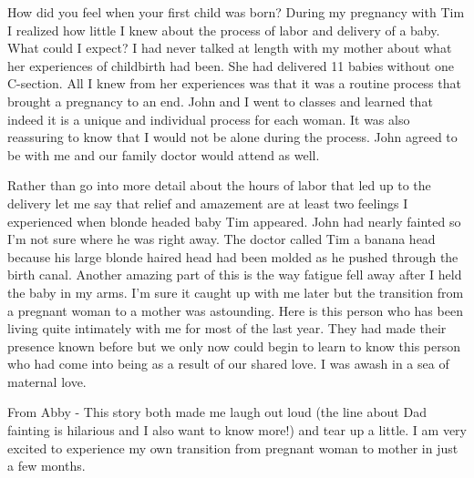 How did you feel when your first child was born?
During my pregnancy with Tim I realized how little I knew about the process of labor and delivery of a baby.
What could I expect? I had never talked at length with my mother about what her experiences of childbirth had been.
She had delivered 11 babies without one C-section.
All I knew from her experiences was that it was a routine process that brought a pregnancy to an end.
John and I went to classes and learned that indeed it is a unique and individual process for each woman.
It was also reassuring to know that I would not be alone during the process.
John agreed to be with me and our family doctor would attend as well.

Rather than go into more detail about the hours of labor that led up to the delivery let me say that relief and amazement are at least two feelings I experienced when blonde headed baby Tim appeared.
John had nearly fainted so I'm not sure where he was right away.
The doctor called Tim a banana head because his large blonde haired head had been molded as he pushed through the birth canal.
Another amazing part of this is the way fatigue fell away after I held the baby in my arms.
I'm sure it caught up with me later but the transition from a pregnant woman to a mother was astounding.
Here is this person who has been living quite intimately with me for most of the last year.
They had made their presence known before but we only now could begin to learn to know this person who had come into being as a result of our shared love.
I was awash in a sea of maternal love.

From Abby - This story both made me laugh out loud (the line about Dad fainting is hilarious and I also want to know more!) and tear up a little.
I am very excited to experience my own transition from pregnant woman to mother in just a few months.





